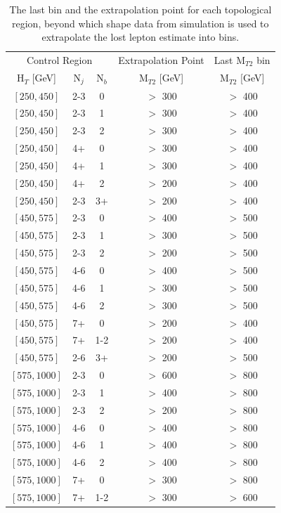 \begin{table}
	\centering
	\renewcommand{\baselinestretch}{1.0}
	\caption{The last \mttwo bin and the \mttwo extrapolation point for each topological region, beyond which shape data from simulation is used to extrapolate the lost lepton estimate into \mttwo bins.}
	\small
	\renewcommand{\arraystretch}{0.5}
	\begin{tabular}{c|c|c|c|c}
\hline \hline
\multicolumn{3}{c|}{Control Region} & Extrapolation Point & Last $\text{M}_{T2}$ bin  \\
$\text{H}_{T}$ [GeV] & $\text{N}_{j}$ & $\text{N}_{b}$ & $\text{M}_{T2}$ [GeV] & $\text{M}_{T2}$ [GeV]\\
\hline
$[250,450]$ &2-3&0& $>$ 300& $>$ 400\\
$[250,450]$ &2-3&1& $>$ 300& $>$ 400\\
$[250,450]$ &2-3&2& $>$ 300& $>$ 400\\
$[250,450]$ &4+&0& $>$ 300& $>$ 400\\
$[250,450]$ &4+&1& $>$ 300& $>$ 400\\
$[250,450]$ &4+&2& $>$ 200& $>$ 400\\
$[250,450]$ &2-3&3+& $>$ 200& $>$ 400\\
$[450,575]$ &2-3&0& $>$ 400& $>$ 500\\
$[450,575]$ &2-3&1& $>$ 300& $>$ 500\\
$[450,575]$ &2-3&2& $>$ 200& $>$ 500\\
$[450,575]$ &4-6&0& $>$ 400& $>$ 500\\
$[450,575]$ &4-6&1& $>$ 300& $>$ 500\\
$[450,575]$ &4-6&2& $>$ 300& $>$ 500\\
$[450,575]$ &7+&0& $>$ 200& $>$ 400\\
$[450,575]$ &7+&1-2& $>$ 200& $>$ 400\\
$[450,575]$ &2-6&3+& $>$ 200& $>$ 500\\
$[575,1000]$ &2-3&0& $>$ 600& $>$ 800\\
$[575,1000]$ &2-3&1& $>$ 400& $>$ 800\\
$[575,1000]$ &2-3&2& $>$ 200& $>$ 800\\
$[575,1000]$ &4-6&0& $>$ 400& $>$ 800\\
$[575,1000]$ &4-6&1& $>$ 400& $>$ 800\\
$[575,1000]$ &4-6&2& $>$ 400& $>$ 800\\
$[575,1000]$ &7+&0& $>$ 300& $>$ 800\\
$[575,1000]$ &7+&1-2& $>$ 300& $>$ 600\\

\end{tabular}
\end{table}
